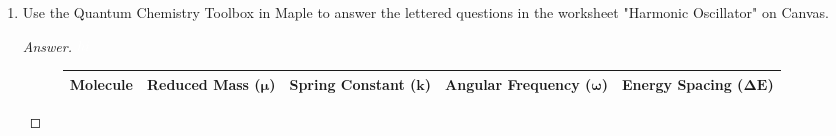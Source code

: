 \documentclass[../psets.tex]{subfiles}
\begin{document}
\begin{enumerate}
    \begin{equation*}
        \prb{T} = \prb{V} = \frac{E_0}{2}
    \end{equation*}
    This relation, known as the \textbf{virial theorem}, is true for all states of the harmonic oscillator.
    \begin{proof}[Answer]
        Invoking the definitions of $\prb{T}$ and $\prb{V}$ and substituting from Problem 5a, we have that
        \begingroup
        \allowdisplaybreaks
        \begin{align*}
            \prb{T} &= \int\psi_0^*(x)\hat{H}\psi_0(x)\dd{x}&
                \prb{V} &= \int\psi_0^*(x)\hat{V}\psi_0(x)\dd{x}\\
            &= \frac{1}{2\mu}\int\psi_0^*(x)\hat{p}^2\psi_0(x)\dd{x}&
                &= \frac{1}{2}k\int\psi_0^*(x)x^2\psi_0(x)\dd{x}\\
            &= \frac{1}{2\mu}\cdot\frac{1}{2}\alpha\hbar^2&
                &= \frac{1}{2}k\cdot\frac{1}{2\alpha}\\
            &= \frac{\hbar^2}{4\mu}\cdot\frac{\sqrt{k\mu}}{\hbar}&
                &= \frac{k}{4}\cdot\frac{\hbar}{\sqrt{k\mu}}\\
            &= \frac{\hbar}{4}\sqrt{\frac{k}{\mu}}&
                &= \frac{\hbar}{4}\sqrt{\frac{k}{\mu}}
        \end{align*}
        \endgroup
        Thus, we have shown that $\prb{T}=\prb{V}$. To complete the proof, we have that
        \begin{equation*}
            \prb{T} = \prb{V}
            = \frac{\hbar}{4}\sqrt{\frac{k}{\mu}}
            = \frac{\frac{\hbar\omega}{2}}{2}
            = \frac{\hbar\omega\left( 0+\frac{1}{2} \right)}{2}
            = \frac{E_0}{2}
        \end{equation*}
        as desired.
    \end{proof}
    \item Use the Quantum Chemistry Toolbox in Maple to answer the lettered questions in the worksheet "Harmonic Oscillator" on Canvas.
    \begin{proof}[Answer]
        ${\color{white}hi}$
        \begin{figure}[H]
            \centering
            \small
            \renewcommand{\arraystretch}{1.4}
            \begin{tabular}{|c|c|c|c|c|}
                \hline
                \textbf{Molecule} & \textbf{Reduced Mass ($\bm{\mu}$)} & \textbf{Spring Constant ($\bm{k}$)} & \textbf{Angular Frequency ($\bm{\omega}$)} & \textbf{Energy Spacing ($\bm{\Delta E}$)}\\ \hline

\end{tabular}
\end{figure}
\end{proof}
\end{enumerate}
\end{document}
